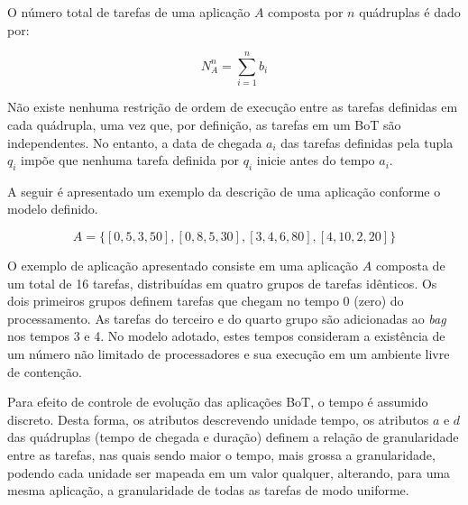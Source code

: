 \documentclass[tese,capa]{texufpel}
\begin{document}

O número total de tarefas de uma aplicação $A$ composta por $n$ quádruplas é dado por: 

\[
N_A^n = \sum_{i=1}^{n}b_i
\]

Não existe nenhuma restrição de ordem de execução entre as tarefas definidas em cada quádrupla, uma vez que, por definição, as tarefas em um BoT são independentes. No entanto, a data de chegada $a_i$ das tarefas definidas pela tupla $q_i$ impõe que nenhuma tarefa definida por $q_i$ inicie antes do tempo $a_i$.

A seguir é apresentado um exemplo da descrição de uma aplicação conforme o modelo definido.

\[
A = \{[0,5,3,50],[0,8,5,30],[3,4,6,80],[4,10,2,20]\}
\]

O exemplo de aplicação apresentado consiste em uma aplicação $A$ composta de um total de 16 tarefas, distribuídas em quatro grupos de tarefas idênticos. Os dois primeiros grupos definem tarefas que chegam no tempo 0 (zero) do processamento. As tarefas do terceiro e do quarto grupo são adicionadas ao \emph{bag} nos tempos 3 e 4. No modelo adotado, estes tempos consideram a existência de um número não limitado de processadores e sua execução em um ambiente livre de contenção.

Para efeito de controle de evolução das aplicações BoT, o tempo é assumido discreto. Desta forma, os atributos descrevendo unidade tempo, os atributos $a$ e $d$ das quádruplas (tempo de chegada e duração) definem a relação de granularidade entre as tarefas, nas quais sendo maior o tempo, mais grossa a granularidade, podendo cada unidade ser mapeada em um valor qualquer, alterando, para uma mesma aplicação, a granularidade de todas as tarefas de modo uniforme.
\end{document}

